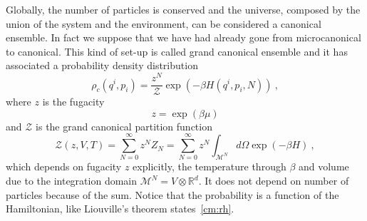     Globally, the number of particles is conserved and the universe, composed by the union of the system and the environment, can be considered a canonical ensemble. In fact we suppose that we have had already gone from microcanonical to canonical. This kind of set-up is called grand canonical ensemble and it has associated a probability density distribution 
    \begin{equation}\label{gc:pdd}
        \rho_c (q^i, p_i) = \frac{z^N}{\mathcal Z} \exp (- \beta H(q^i, p_i, N)) ~,
    \end{equation}
    where $z$ is the fugacity
    \begin{equation*}
        z = \exp(\beta \mu)
    \end{equation*}
    and $\mathcal Z$ is the grand canonical partition function 
    \begin{equation}\label{gc:z}
        \mathcal Z (z, V, T) = \sum_{N = 0}^{\infty} z^N Z_N = \sum_{N = 0}^{\infty} z^N \int_{\mathcal M^N} d\Omega \exp(-\beta H) ~,
    \end{equation}
    which depends on fugacity $z$ explicitly, the temperature through $\beta$ and volume due to the integration domain $\mathcal M^N = V \otimes \mathbb R^d$. It does not depend on number of particles because of the sum. Notice that the probability is a function of the Hamiltonian, like Liouville's theorem states~\eqref{cm:rh}.
